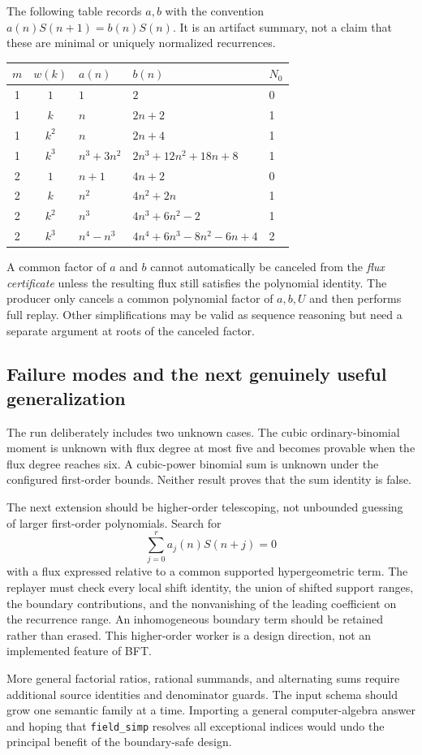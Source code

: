 The following table records $a,b$ with the convention $a(n)S(n+1)=b(n)S(n)$. It is an artifact summary, not a claim that these are minimal or uniquely normalized recurrences.

\begin{center}
\small
\begin{tabular}{@{}cclll@{}}
\toprule
$m$ & $w(k)$ & $a(n)$ & $b(n)$ & $N_0$\\
\midrule
1 & $1$ & $1$ & $2$ & 0\\
1 & $k$ & $n$ & $2n+2$ & 1\\
1 & $k^2$ & $n$ & $2n+4$ & 1\\
1 & $k^3$ & $n^3+3n^2$ & $2n^3+12n^2+18n+8$ & 1\\
2 & $1$ & $n+1$ & $4n+2$ & 0\\
2 & $k$ & $n^2$ & $4n^2+2n$ & 1\\
2 & $k^2$ & $n^3$ & $4n^3+6n^2-2$ & 1\\
2 & $k^3$ & $n^4-n^3$ & $4n^4+6n^3-8n^2-6n+4$ & 2\\
\bottomrule
\end{tabular}
\end{center}

A common factor of $a$ and $b$ cannot automatically be canceled from the \emph{flux certificate} unless the resulting flux still satisfies the polynomial identity. The producer only cancels a common polynomial factor of $a,b,U$ and then performs full replay. Other simplifications may be valid as sequence reasoning but need a separate argument at roots of the canceled factor.

\subsection{Failure modes and the next genuinely useful generalization}

The run deliberately includes two unknown cases. The cubic ordinary-binomial moment is unknown with flux degree at most five and becomes provable when the flux degree reaches six. A cubic-power binomial sum is unknown under the configured first-order bounds. Neither result proves that the sum identity is false.

The next extension should be higher-order telescoping, not unbounded guessing of larger first-order polynomials. Search for
\[
 \sum_{j=0}^r a_j(n)S(n+j)=0
\]
with a flux expressed relative to a common supported hypergeometric term. The replayer must check every local shift identity, the union of shifted support ranges, the boundary contributions, and the nonvanishing of the leading coefficient on the recurrence range. An inhomogeneous boundary term should be retained rather than erased. This higher-order worker is a design direction, not an implemented feature of BFT.

More general factorial ratios, rational summands, and alternating sums require additional source identities and denominator guards. The input schema should grow one semantic family at a time. Importing a general computer-algebra answer and hoping that \texttt{field\_simp} resolves all exceptional indices would undo the principal benefit of the boundary-safe design.
